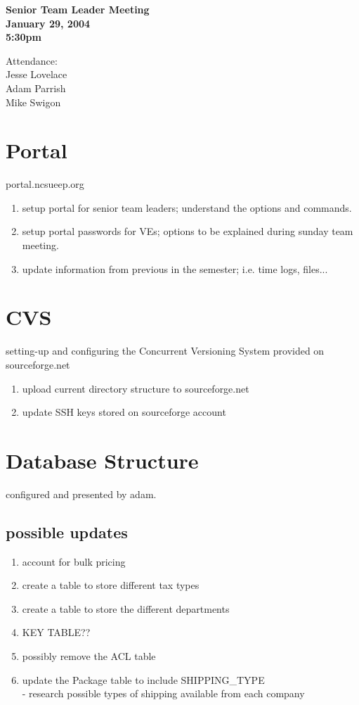 \documentclass{article}
\begin{document}
\begin{flushleft}
{\bf Senior Team Leader Meeting}\\
{\bf January 29, 2004}\\
{\bf 5:30pm}\\
\end{flushleft}

\begin{flushleft}
Attendance:\\
Jesse Lovelace \\
Adam Parrish \\
Mike Swigon \\
\end{flushleft}

\section{Portal}
portal.ncsueep.org
\begin{enumerate}
    \item setup portal for senior team leaders; understand the options and commands.
    \item setup portal passwords for VEs; options to be explained during sunday team meeting.
    \item update information from previous in the semester; i.e. time logs, files...
\end{enumerate}

\section{CVS}
setting-up and configuring the Concurrent Versioning System provided on sourceforge.net
\begin{enumerate}
    \item upload current directory structure to sourceforge.net
    \item update SSH keys stored on sourceforge account
\end{enumerate}

\section{Database Structure}
configured and presented by adam.
\subsection{possible updates}
\begin{enumerate}
    \item account for bulk pricing
    \item create a table to store different tax types
    \item create a table to store the different departments
    \item KEY TABLE??
    \item possibly remove the ACL table
    \item update the Package table to include SHIPPING\_TYPE \\ - research possible types of shipping available from each company

\end{enumerate}
\end{document}
